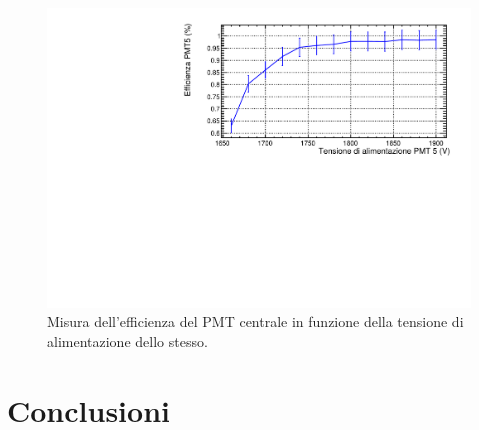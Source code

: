 \documentclass[a4paper,10pt]{article}
\begin{document}
\begin{figure}
	\centering
	\includegraphics[width=\textwidth]{fig/efficiency}
	\caption{Misura dell'efficienza del PMT centrale in funzione della tensione di alimentazione dello stesso.}
	\label{fig:efficiency}
\end{figure}

\label{sec:efficienza} 


\section{Conclusioni}

\end{document}
